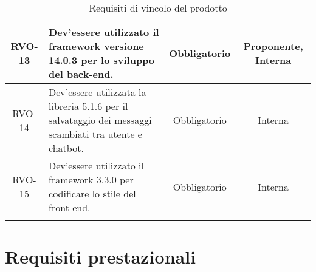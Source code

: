 \begin{xltabular}{\textwidth}{| c | X | c | c |}
    \hline
    RVO-13 & Dev'essere utilizzato il framework  versione 14.0.3 per lo sviluppo del back-end. & Obbligatorio & Proponente, Interna \\
    \hline
    RVO-14 & Dev'essere utilizzata la libreria  5.1.6 per il salvataggio dei messaggi scambiati tra utente e chatbot. & Obbligatorio & Interna \\
    \hline
    RVO-15 & Dev'essere utilizzato il framework  3.3.0 per codificare lo stile del front-end. & Obbligatorio & Interna \\
    \hline
     \caption{Requisiti di vincolo del prodotto}
    \label{tab:reqvin}
\end{xltabular}
\endgroup

\section{Requisiti prestazionali}

